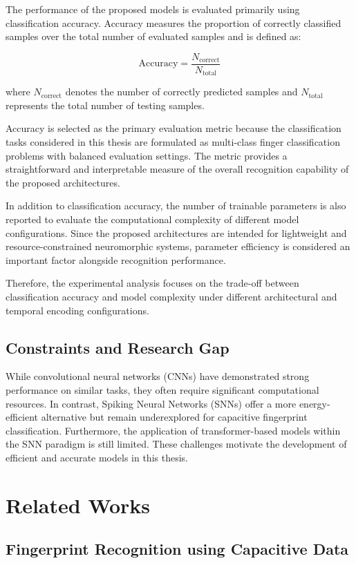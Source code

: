 \documentclass[../main.tex]{subfiles}
\begin{document}
The performance of the proposed models is evaluated primarily using classification accuracy. Accuracy measures the proportion of correctly classified samples over the total number of evaluated samples and is defined as:

\[
\text{Accuracy} =
\frac{N_{\text{correct}}}{N_{\text{total}}}
\]

where \(N_{\text{correct}}\) denotes the number of correctly predicted samples and \(N_{\text{total}}\) represents the total number of testing samples.

Accuracy is selected as the primary evaluation metric because the classification tasks considered in this thesis are formulated as multi-class finger classification problems with balanced evaluation settings. The metric provides a straightforward and interpretable measure of the overall recognition capability of the proposed architectures.

In addition to classification accuracy, the number of trainable parameters is also reported to evaluate the computational complexity of different model configurations. Since the proposed architectures are intended for lightweight and resource-constrained neuromorphic systems, parameter efficiency is considered an important factor alongside recognition performance.

Therefore, the experimental analysis focuses on the trade-off between classification accuracy and model complexity under different architectural and temporal encoding configurations.

\subsection{Constraints and Research Gap}
While convolutional neural networks (CNNs) have demonstrated strong performance on similar tasks, they often require significant computational resources. In contrast, Spiking Neural Networks (SNNs) offer a more energy-efficient alternative but remain underexplored for capacitive fingerprint classification. Furthermore, the application of transformer-based models within the SNN paradigm is still limited. These challenges motivate the development of efficient and accurate models in this thesis.

\section{Related Works}
\subsection{Fingerprint Recognition using Capacitive Data}
\end{document}
